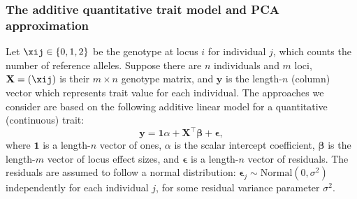 \documentclass[11pt]{article}
\begin{document}
\subsubsection{The additive quantitative trait model and PCA approximation}

Let $\xij \in \{ 0, 1, 2 \}$ be the genotype at locus $i$ for individual $j$, which counts the number of reference alleles.
Suppose there are $n$ individuals and $m$ loci,
$\mathbf{X} = ( \xij )$ is their $m \times n$ genotype matrix, and
$\mathbf{y}$ is the length-$n$ (column) vector which represents trait value for each individual.
The approaches we consider are based on the following additive linear model for a quantitative (continuous) trait:
\begin{equation}
  \label{eq:trait}
  \mathbf{y}
  =
  \mathbf{1} \alpha + \mathbf{X}^\intercal \mathbf{\beta} + \mathbf{\epsilon}
  ,
\end{equation}
where
$\mathbf{1}$ is a length-$n$ vector of ones,
$\alpha$ is the scalar intercept coefficient,
$\mathbf{\beta}$ is the length-$m$ vector of locus effect sizes, and
$\mathbf{\epsilon}$ is a length-$n$ vector of residuals.
The residuals are assumed to follow a normal distribution: $\mathbf{\epsilon}_j \sim \text{Normal}(0, \sigma^2)$ independently for each individual $j$, for some residual variance parameter $\sigma^2$.
\end{document}
